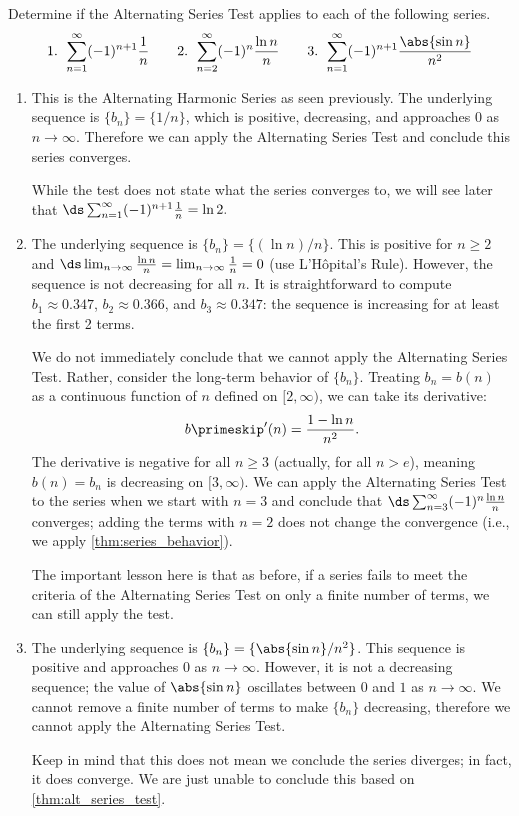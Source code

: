 \begin{example}\label{ex_alt1}
Determine if the Alternating Series Test applies to each of the following series.
\[
 \text{1. }\sum_{n=1}^\infty (-1)^{n+1}\frac1n\qquad
 \text{2. }\sum_{n=2}^\infty (-1)^n\frac{\ln n}{n}\qquad
 \text{3. }\sum_{n=1}^\infty (-1)^{n+1}\frac{\abs{\sin n}}{n^2}
\]
\solution
\begin{enumerate}
	\item This is the Alternating Harmonic Series as seen previously. The underlying sequence is $\{b_n\} = \{1/n\}$, which is positive, decreasing, and approaches 0 as $n\to\infty$. Therefore we can apply the Alternating Series Test and conclude this series converges. 
	
	While the test does not state what the series converges to, we will see later that $\ds \sum_{n=1}^\infty (-1)^{n+1}\frac1n=\ln2.$
	
	\item		The underlying sequence is $\{b_n\} = \{(\ln n)/n\}$. This is positive for $n\geq 2$ and $\ds \lim_{n\to \infty} \frac{\ln n}{n}=\lim_{n\to \infty}\frac{1}{n}=0$ (use L'Hôpital's Rule). However, the sequence is not decreasing for all $n$. It is straightforward to compute $b_1\approx0.347$, $b_2\approx 0.366$, and $b_3\approx 0.347$: the sequence is increasing for at least the first 2 terms. 
	
	We do not immediately conclude that we cannot apply the Alternating Series Test. Rather, consider the long-term behavior of $\{b_n\}$. Treating $b_n=b(n)$ as a continuous function of $n$ defined on $[2,\infty)$, we can take its derivative:
	\[b\primeskip'(n) = \frac{1-\ln n}{n^2}.\]
	The derivative is negative for all $n\geq 3$ (actually, for all $n>e$), meaning $b(n)=b_n$ is decreasing on $[3,\infty)$. We can apply the Alternating Series Test to the series when we start with $n=3$ and conclude that $\ds \sum_{n=3}^\infty(-1)^n\frac{\ln n}{n}$ converges; adding the terms with $n=2$ does not change the convergence (i.e., we apply \autoref{thm:series_behavior}).
	
	The important lesson here is that as before, if a series fails to meet the criteria of the Alternating Series Test on only a finite number of terms, we can still apply the test.
	
	\item  The underlying sequence is $\{b_n\} = \{\abs{\sin n}/n^2\}$. This sequence is positive and approaches $0$ as $n\to\infty$. However, it is not a decreasing sequence; the value of $\abs{\sin n}$ oscillates between $0$ and $1$ as $n\to\infty$. We cannot remove a finite number of terms to make $\{b_n\}$ decreasing, therefore we cannot apply the Alternating Series Test.
	
	Keep in mind that this does not mean we conclude the series diverges; in fact, it does converge. We are just unable to conclude this based on \autoref{thm:alt_series_test}.
\end{enumerate}
\end{example}

